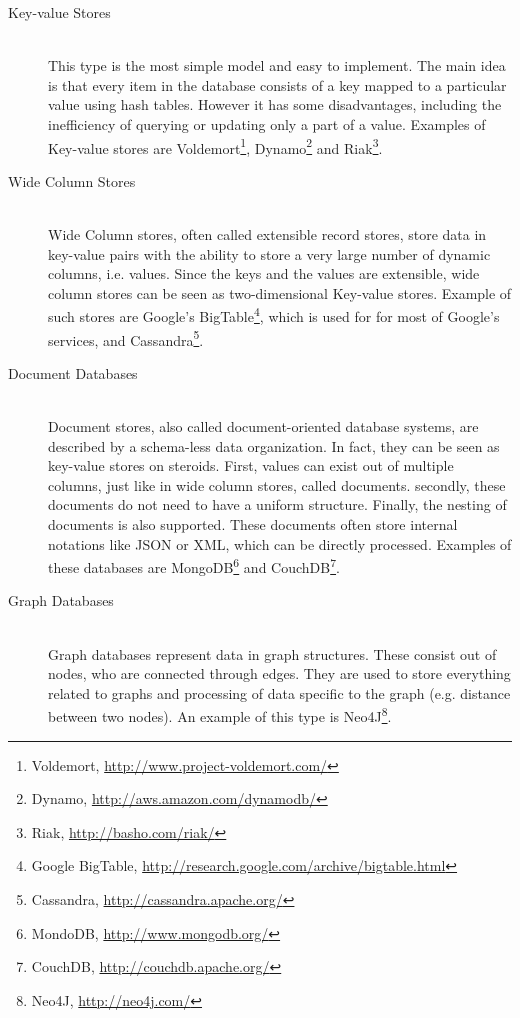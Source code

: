 \documentclass[a4paper,12pt]{report}
\begin{document}
\begin{description}
 \item[Key-value Stores] \hfill \\This type is the most simple model and easy to implement. The main idea is that every item in the database consists of a key mapped to a particular value using hash tables. However it has some disadvantages, including the inefficiency of querying or updating only a part of a value. Examples of Key-value stores are Voldemort\footnote{Voldemort, \url{http://www.project-voldemort.com/}}, Dynamo\footnote{Dynamo, \url{http://aws.amazon.com/dynamodb/}} and Riak\footnote{Riak, \url{http://basho.com/riak/}}.
 \item[Wide Column Stores] \hfill \\Wide Column stores, often called extensible record stores, store data in key-value pairs with the ability to store a very large number of dynamic columns, i.e. values. Since the keys and the values are extensible, wide column stores can be seen as two-dimensional Key-value stores. Example of such stores are Google's BigTable\footnote{Google BigTable, \url{http://research.google.com/archive/bigtable.html}}, which is used for for most of Google's services, and Cassandra\footnote{Cassandra, \url{http://cassandra.apache.org/}}.
 \item[Document Databases] \hfill \\Document stores, also called document-oriented database systems, are described by a schema-less data organization. In fact, they can be seen as key-value stores on steroids. First, values can exist out of multiple columns, just like in wide column stores, called documents. secondly, these documents do not need to have a uniform structure. Finally, the nesting of documents is also supported. These documents often store internal notations like JSON or XML, which can be directly processed. Examples of these databases are MongoDB\footnote{MondoDB, \url{http://www.mongodb.org/}} and CouchDB\footnote{CouchDB, \url{http://couchdb.apache.org/}}.    
 \item[Graph Databases] \hfill \\Graph databases represent data in graph structures. These consist out of nodes, who are connected through edges. They are used to store everything related to graphs and processing of data specific to the graph (e.g. distance between two nodes). An example of this type is Neo4J\footnote{Neo4J, \url{http://neo4j.com/}}.    
\end{description}
\end{document}
